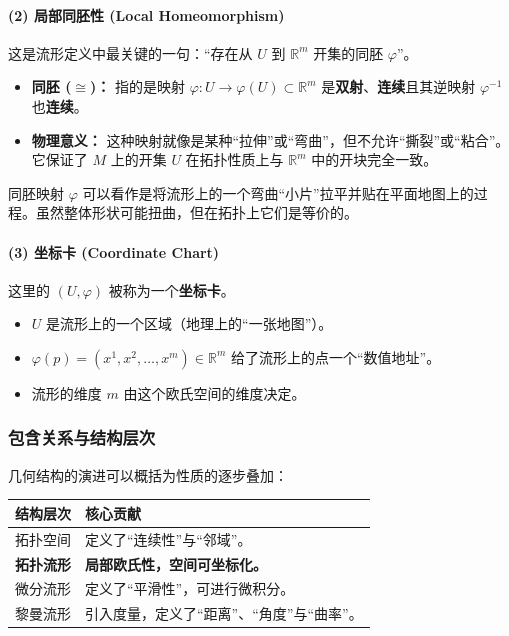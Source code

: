 \begin{myremark}[拓扑流形]
\paragraph*{(2) 局部同胚性 (Local Homeomorphism)}
这是流形定义中最关键的一句：“存在从 $U$ 到 $\mathbb{R}^m$ 开集的同胚 $\varphi$”。
\begin{itemize}
\item \textbf{同胚 ($\cong$)：} 指的是映射 $\varphi: U \to \varphi(U) \subset \mathbb{R}^m$ 是\textbf{双射}、\textbf{连续}且其逆映射 $\varphi^{-1}$ 也\textbf{连续}。
\item \textbf{物理意义：} 这种映射就像是某种“拉伸”或“弯曲”，但不允许“撕裂”或“粘合”。它保证了 $M$ 上的开集 $U$ 在拓扑性质上与 $\mathbb{R}^m$ 中的开块完全一致。
\end{itemize}

同胚映射 $\varphi$ 可以看作是将流形上的一个弯曲“小片”拉平并贴在平面地图上的过程。虽然整体形状可能扭曲，但在拓扑上它们是等价的。

\paragraph*{(3) 坐标卡 (Coordinate Chart)}
这里的 $(U, \varphi)$ 被称为一个\textbf{坐标卡}。
\begin{itemize}
\item $U$ 是流形上的一个区域（地理上的“一张地图”）。
\item $\varphi(p) = (x^1, x^2, \dots, x^m) \in \mathbb{R}^m$ 给了流形上的点一个“数值地址”。
\item 流形的维度 $m$ 由这个欧氏空间的维度决定。
\end{itemize}

\subsubsection*{包含关系与结构层次}
几何结构的演进可以概括为性质的逐步叠加：
\begin{myremarktable}[]
    \begin{longtable}{l p{10cm}} %
        \toprule
	\textbf{结构层次} & \textbf{核心贡献} \\
        \midrule
        拓扑空间 & 定义了“连续性”与“邻域”。 \\
        \textbf{拓扑流形} & \textbf{局部欧氏性，空间可坐标化。} \\
        微分流形 & 定义了“平滑性”，可进行微积分。 \\
        黎曼流形 & 引入度量，定义了“距离”、“角度”与“曲率”。 \\
        \bottomrule
    \end{longtable}
\end{myremarktable}


\end{myremark}
